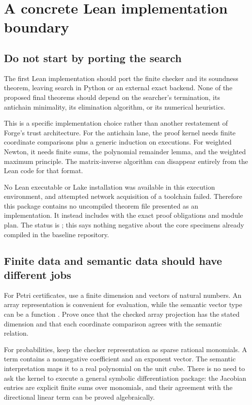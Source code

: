 \section{A concrete Lean implementation boundary}
\label{sec:integration}
\subsection{Do not start by porting the search}
The first Lean implementation should port the finite checker and its soundness theorem, leaving search in Python or an external exact backend. None of the proposed final theorems should depend on the searcher's termination, its antichain minimality, its elimination algorithm, or its numerical heuristics.

This is a specific implementation choice rather than another restatement of Forge's trust architecture. For the antichain lane, the proof kernel needs finite coordinate comparisons plus a generic induction on executions. For weighted Newton, it needs finite sums, the polynomial remainder lemma, and the weighted maximum principle. The matrix-inverse algorithm can disappear entirely from the Lean code for that format.

No Lean executable or Lake installation was available in this execution environment, and attempted network acquisition of a toolchain failed. Therefore this package contains no uncompiled theorem file presented as an implementation. It instead includes  with the exact proof obligations and module plan. The status is ; this says nothing negative about the core specimens already compiled in the baseline repository.

\subsection{Finite data and semantic data should have different jobs}
For Petri certificates, use a finite dimension and vectors of natural numbers. An array representation is convenient for evaluation, while the semantic vector type can be a function . Prove once that the checked array projection has the stated dimension and that each coordinate comparison agrees with the semantic relation.

For probabilities, keep the checker representation as sparse rational monomials. A term contains a nonnegative coefficient and an exponent vector. The semantic interpretation maps it to a real polynomial on the unit cube. There is no need to ask the kernel to execute a general symbolic differentiation package: the Jacobian entries are explicit finite sums over monomials, and their agreement with the directional linear term can be proved algebraically.

